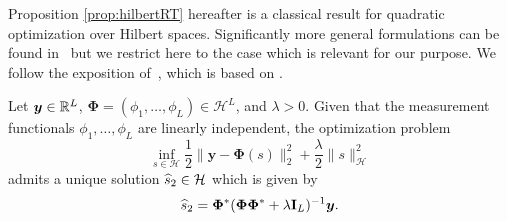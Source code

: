 \documentclass[12pt]{article}
\begin{document}
    
   Proposition \ref{prop:hilbertRT} hereafter is a classical result for quadratic optimization over Hilbert spaces. Significantly more general formulations can be found in~\cite{Scholkopf2001generalized} but we restrict here to the case which is relevant for our purpose. We follow the exposition of~\cite[Theorem~7]{caponera2021nonparametric}, which is based on \cite[Section~3.2]{Unser2020}. 

    \begin{proposition}
    \label{prop:hilbertRT}
    Let $\bm{y}\in \mathbb{R}^L$, $\bm{\Phi}= (\phi_1 ,\ldots , \phi_L) \in \mathcal{H}^L$, and $\lambda > 0$. Given that the measurement functionals $\phi_1, \dots, \phi_L$ are linearly independent, the optimization problem 
    \begin{equation} \label{eq:hibertpb}
        \inf_{s \in \mathcal{H}} \frac{1}{2} \| \bm{y} - \bm{\Phi}(s) \|_2^2 + \frac{\lambda}{2} \| s \|_{\mathcal{H}}^2
    \end{equation}
    admits a unique solution $\widehat{s}_2 \in \mathcal{H}$ which is given by
    \begin{equation} \label{eq:widehathilb}
        \widehat{s}_2  = \bm{\Phi}^* ( \bm{\Phi} \bm{\Phi}^* + \lambda \mathbf{I}_L)^{-1} \bm{y}.
    \end{equation}
    \end{proposition}
    
\end{document}
